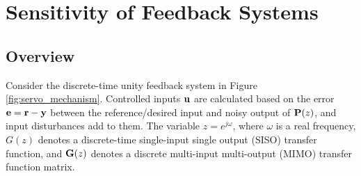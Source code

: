\chapter{Sensitivity of Feedback Systems}
\label{appendix:sensitivity}
\section{Overview}
Consider the discrete-time unity feedback system in Figure \ref{fig:servo_mechanism}.  Controlled inputs $\vb{u}$ are calculated based on the error $\vb{e} = \vb{r} - \vb{y}$ between the reference/desired input and noisy output of $\vb{P}(z)$, and input disturbances add to them.
The variable $z = e^{j\omega}$, where $\omega$ is a real frequency, $G(z)$ denotes a discrete-time single-input single output (SISO) transfer function, and $\vb{G}(z)$ denotes a discrete multi-input multi-output (MIMO) transfer function matrix. 
